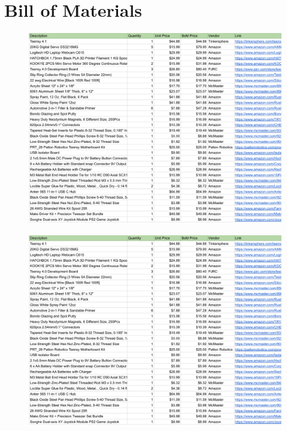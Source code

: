 \chapter{Bill of Materials}
\label{ch:bom}
\begin{figure}[h]
    \centering
    \includegraphics[page=1,width=\textwidth]{Thesis/appendix/BoM for Writeup - BOM (5).pdf}
    \label{fig:bom1}
\end{figure}
\begin{figure}[h]
    \centering
    \includegraphics[page=2,width=\textwidth]{Thesis/appendix/BoM for Writeup - BOM (5).pdf}
    \label{fig:bom2}
\end{figure}